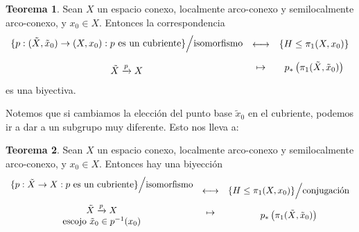 \documentclass[spanish]{book}
\theoremstyle{definition}
\newtheorem*{teo}{Teorema}
\begin{document}
\begin{teo}
	Sean $X$ un espacio conexo, localmente arco-conexo y semilocalmente arco-conexo, y $x_0\in X$. Entonces la correspondencia
	\[
	\begin{array}{c}
		\{p:(\tilde{X},\tilde{x}_0)\to(X,x_0):p\text{ es un cubriente}\}\Big/\text{isomorfismo}\\\leavevmode\\
		\tilde{X}\xrightarrow{p} X
	\end{array}
	\begin{array}{c}
		\longleftrightarrow\\\leavevmode\\
		\mapsto
	\end{array}
	\begin{array}{c}
		\{H\leq\pi_1(X,x_0)\}\\\leavevmode\\
		p_*\left(\pi_1(\tilde{X},\tilde{x}_0)\right)
	\end{array}
	\]
	es una biyectiva.
\end{teo}
Notemos que si cambiamos la elección del punto base $\tilde{x}_0$ en el cubriente, podemos ir a dar a un subgrupo muy diferente. Esto nos lleva a:
\begin{teo}
	Sean $X$ un espacio conexo, localmente arco-conexo y semilocalmente arco-conexo, y $x_0\in X$. Entonces hay una biyección
		\[
	\begin{array}{c}
		\{p:\tilde{X}\to X:p\text{ es un cubriente}\}\Big/\text{isomorfismo}\\\leavevmode\\
		\tilde{X}\xrightarrow{p} X\\
		\text{escojo }\tilde{x}_0\in p^{-1}(x_0)
	\end{array}
	\begin{array}{c}
		\longleftrightarrow\\\leavevmode\\
		\mapsto
	\end{array}
	\begin{array}{c}
		\{H\leq\pi_1(X,x_0)\}\Big/\text{conjugación}\\\leavevmode\\
		p_*\left(\pi_1(\tilde{X},\tilde{x}_0)\right)
	\end{array}
	\]
\end{teo}
\end{document}
